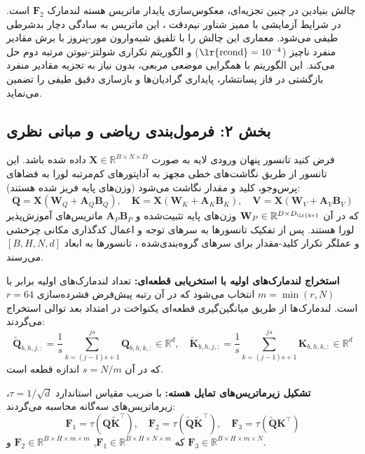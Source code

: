 چالش بنیادین در چنین تجزیه‌ای، معکوس‌سازی پایدار ماتریس هسته لندمارک $\mathbf{F}_2$ است. در شرایط آزمایشی با ممیز شناور نیم‌دقت ، این ماتریس به سادگی دچار بدشرطی طیفی  می‌شود. معماری  این چالش را با تلفیق شبه‌وارون مور-پنروز  با برش مقادیر منفرد ناچیز ($\text{\lr{rcond}} = 10^{-4}$) و الگوریتم تکراری شولتز-نیوتن مرتبه دوم  حل می‌کند. این الگوریتم با همگرایی موضعی مربعی، بدون نیاز به تجزیه مقادیر منفرد بازگشتی در فاز پسانتشار، پایداری گرادیان‌ها و بازسازی دقیق طیفی را تضمین می‌نماید.

\subsection*{بخش ۲: فرمول‌بندی ریاضی و مبانی نظری }
فرض کنید تانسور پنهان ورودی لایه به صورت $\mathbf{X} \in \mathbb{R}^{B \times N \times D}$ داده شده باشد. این تانسور از طریق نگاشت‌های خطی مجهز به آداپتورهای کم‌مرتبه لورا  به فضاهای پرس‌وجو، کلید و مقدار نگاشت می‌شود (وزن‌های پایه فریز شده هستند):
\begin{equation}
\mathbf{Q} = \mathbf{X}(\mathbf{W}_Q + \mathbf{A}_Q\mathbf{B}_Q), \quad \mathbf{K} = \mathbf{X}(\mathbf{W}_K + \mathbf{A}_K\mathbf{B}_K), \quad \mathbf{V} = \mathbf{X}(\mathbf{W}_V + \mathbf{A}_V\mathbf{B}_V)
\end{equation}
که در آن $\mathbf{W}_P \in \mathbb{R}^{D \times D_{\text{\lr{kv}}}}$ وزن‌های پایه تثبیت‌شده  و $\mathbf{A}_P\mathbf{B}_P$ ماتریس‌های آموزش‌پذیر لورا هستند. پس از تفکیک تانسورها به سرهای توجه و اعمال کدگذاری مکانی چرخشی  و عملگر تکرار کلید-مقدار  برای سرهای گروه‌بندی‌شده ، تانسورها به ابعاد $[B, H, N, d]$ می‌رسند.

\textbf{استخراج لندمارک‌های اولیه با استخریابی قطعه‌ای:}
تعداد لندمارک‌های اولیه برابر با $m = \min(r, N)$ انتخاب می‌شود که در آن رتبه پیش‌فرض فشرده‌سازی $r = 64$ است. لندمارک‌ها از طریق میانگین‌گیری قطعه‌ای یکنواخت در امتداد بعد توالی استخراج می‌گردند:
\begin{equation}
\tilde{\mathbf{Q}}_{b, h, j, :} = \frac{1}{s} \sum_{k=(j-1)s + 1}^{j s} \mathbf{Q}_{b, h, k, :} \in \mathbb{R}^{d}, \quad \tilde{\mathbf{K}}_{b, h, j, :} = \frac{1}{s} \sum_{k=(j-1)s + 1}^{j s} \mathbf{K}_{b, h, k, :} \in \mathbb{R}^{d}
\end{equation}
که در آن $s = N / m$ اندازه قطعه است.

\textbf{تشکیل زیرماتریس‌های تمایل هسته:}
با ضریب مقیاس استاندارد $\tau = 1/\sqrt{d}$، زیرماتریس‌های سه‌گانه محاسبه می‌گردند:
\begin{equation}
\mathbf{F}_1 = \tau \left( \mathbf{Q} \tilde{\mathbf{K}}^\top \right), \quad \mathbf{F}_2 = \tau \left( \tilde{\mathbf{Q}} \tilde{\mathbf{K}}^\top \right), \quad \mathbf{F}_3 = \tau \left( \tilde{\mathbf{Q}} \mathbf{K}^\top \right)
\end{equation}
که $\mathbf{F}_1 \in \mathbb{R}^{B \times H \times N \times m}$, $\mathbf{F}_2 \in \mathbb{R}^{B \times H \times m \times m}$ و $\mathbf{F}_3 \in \mathbb{R}^{B \times H \times m \times N}$.

